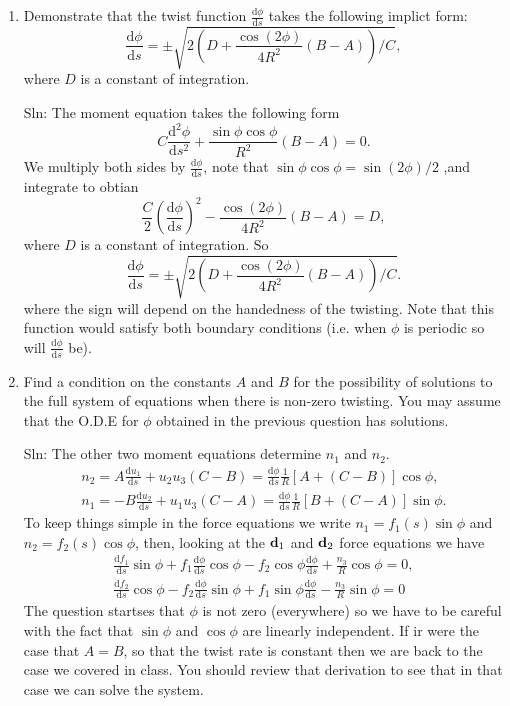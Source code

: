 \documentclass[]{article}
\newcommand{\rmd}{\mathrm{d}}
\newcommand{\deriv}[2]{\frac{\rmd#1}{\rmd #2}}
\newcommand{\derivn}[3]{\frac{\rmd^{#3} #1}{\rmd #2^{#3}}}
\begin{document}
\begin{enumerate}[label=(\alph*)]
{Sln:
We require that $\phi(0)=\phi(2\pi R)+2\pi n$ for some integer $n$ and $\deriv{\phi}{s}(0)=\deriv{\phi}{s}(2\pi R)$.
}\item{
Demonstrate that the twist function $\deriv{\phi}{s}$ takes the following implict form:
\begin{equation}
\deriv{\phi}{s}=\pm \sqrt{2\left(D+\frac{\cos(2\phi)}{4R^2}(B-A)\right)/C},
\end{equation}
where $D$ is a constant of integration.

Sln:
The moment equation takes the following form
\begin{equation}
C\derivn{\phi}{s}{2} + \frac{\sin\phi\cos\phi}{R^2}(B-A) =0.
\end{equation}
We multiply both sides by $\deriv{\phi}{s}$, note that $\sin\phi\cos\phi =\sin(2\phi)/2$ ,and integrate to obtian
\begin{equation}
\frac{C}{2}\left(\deriv{\phi}{s}\right)^2 -\frac{\cos(2\phi)}{4R^2}(B-A)= D,
\end{equation}
where $D$ is a constant of integration. So 
\begin{equation}
\deriv{\phi}{s}=\pm \sqrt{2\left(D+\frac{\cos(2\phi)}{4R^2}(B-A)\right)/C}.
\end{equation}
where the sign will depend on the handedness of the twisting. Note that this function would satisfy both boundary conditions (i.e. when $\phi$ is periodic so will $\deriv{\phi}{s}$ be). 
}\item{
Find a condition on the constants $A$ and $B$ for the possibility of solutions to the full system of equations when there is non-zero twisting. You may assume that the O.D.E for $\phi$ obtained in the previous question has solutions.

Sln:
The other two moment equations determine $n_1$ and $n_2$.
\begin{align}
n_2 = A\deriv{u_1}{s}+ u_2u_3(C-B)=\deriv{\phi}{s}\frac{1}{R}\left[A + (C-B)\right]\cos\phi,\\
n_1 =  -B\deriv{u_2}{s}+ u_1u_3(C-A)= \deriv{\phi}{s}\frac{1}{R}\left[B + (C-A)\right]\sin\phi.
\end{align}
To keep things simple in the force equations we write $n_1 = f_1(s)\sin\phi$ and $n_2=f_2(s)\cos\phi$, then, looking at the ${\bf d}_1$ and ${\bf d}_2$ force equations we have
\begin{align}
\label{feq1q1}\deriv{f_1}{s}\sin\phi+f_1\deriv{\phi}{s}\cos\phi-f_2\cos\phi\deriv{\phi}{s} +\frac{n_3}{R}\cos\phi =0,\\
\label{feq2q2}\deriv{f_2}{s}\cos\phi-f_2\deriv{\phi}{s}\sin\phi +f_1\sin\phi\deriv{\phi}{s} -\frac{n_3}{R}\sin\phi =0
\end{align}
The question startses that $\phi$ is not zero (everywhere) so we have to be careful with the fact that $\sin\phi$ and $\cos\phi$ are linearly independent. If ir were the case that $A=B$, so that the twist rate is constant then we are back to the case we covered in class. You should review that derivation to see that in that case we can solve the system.

}
\end{enumerate}
\end{document}
